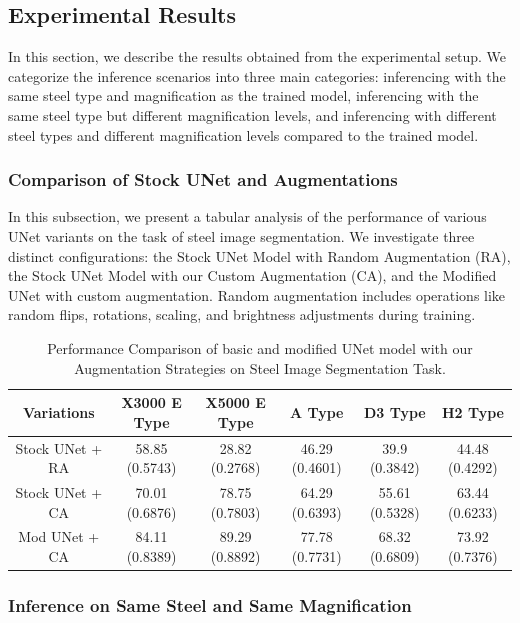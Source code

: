 \documentclass[]{article}
\begin{document}
\subsection{Experimental Results}

In this section, we describe the results obtained from the experimental setup. We categorize the inference scenarios into three main categories: inferencing with the same steel type and magnification as the trained model, inferencing with the same steel type but different magnification levels, and inferencing with different steel types and different magnification levels compared to the trained model. 

\subsubsection{Comparison of Stock UNet and Augmentations}

In this subsection, we present a tabular analysis of the performance of various UNet variants on the task of steel image segmentation. We investigate three distinct configurations: the Stock UNet Model with Random Augmentation (RA), the Stock UNet Model with our Custom Augmentation (CA), and the Modified UNet with custom augmentation. Random augmentation includes operations like random flips, rotations, scaling, and brightness adjustments during training.


\begin{table}[h!]
	\centering
	\begin{tabular}{|c|c|c|c|c|c|}
		\hline
		Variations & X3000 E Type & X5000 E Type & A Type & D3 Type & H2 Type \\
		\hline
		Stock UNet + RA & 58.85 (0.5743) & 28.82 (0.2768) & 46.29 (0.4601) & 39.9 (0.3842) & 44.48 (0.4292) \\
		Stock UNet + CA & 70.01 (0.6876) & 78.75 (0.7803) & 64.29 (0.6393) & 55.61 (0.5328) & 63.44 (0.6233) \\
		\rowcolor{yellow!30} Mod UNet + CA & 84.11 (0.8389) & 89.29 (0.8892) & 77.78 (0.7731) & 68.32 (0.6809) & 73.92 (0.7376) \\
		\hline
	\end{tabular}
	\caption{Performance Comparison of basic and modified UNet model with our Augmentation Strategies on Steel Image Segmentation Task.}
\end{table}

\subsubsection{Inference on Same Steel and Same Magnification}
\end{document}
